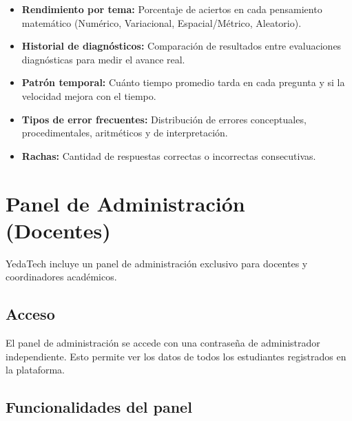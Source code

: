 \documentclass[12pt, a4paper]{article}
\begin{document}
\begin{itemize}[leftmargin=*, itemsep=5pt]
    \item[\textcolor{ytOrange}{\faIcon{chart-bar}}] \textbf{Rendimiento por tema:} Porcentaje de aciertos en cada pensamiento matemático (Numérico, Variacional, Espacial/Métrico, Aleatorio).
    \item[\textcolor{ytBlue}{\faIcon{history}}] \textbf{Historial de diagnósticos:} Comparación de resultados entre evaluaciones diagnósticas para medir el avance real.
    \item[\textcolor{ytGreen}{\faIcon{clock}}] \textbf{Patrón temporal:} Cuánto tiempo promedio tarda en cada pregunta y si la velocidad mejora con el tiempo.
    \item[\textcolor{ytRed}{\faIcon{exclamation-triangle}}] \textbf{Tipos de error frecuentes:} Distribución de errores conceptuales, procedimentales, aritméticos y de interpretación.
    \item[\textcolor{ytYellow}{\faIcon{fire}}] \textbf{Rachas:} Cantidad de respuestas correctas o incorrectas consecutivas.
\end{itemize}

\section{Panel de Administración (Docentes)}

YedaTech incluye un panel de administración exclusivo para docentes y coordinadores académicos.

\subsection{Acceso}

El panel de administración se accede con una contraseña de administrador independiente. Esto permite ver los datos de todos los estudiantes registrados en la plataforma.

\subsection{Funcionalidades del panel}
\end{document}
